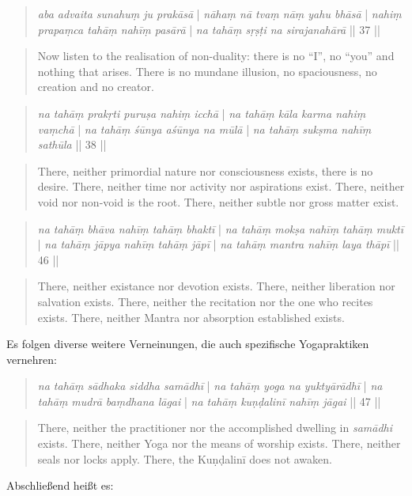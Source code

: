 \begin{quote}
\textit{aba advaita sunahuṃ ju prakāsā} | \textit{nāhaṃ nā tvaṃ nāṃ yahu bhāsā} |
\textit{nahiṃ prapaṃca tahāṃ nahīṃ pasārā} | \textit{na tahāṃ sṛṣṭi na sirajanahārā} || 37 ||
\end{quote}
\begin{quote}
Now listen to the realisation of non-duality: there is no ``I'', no ``you'' and nothing that arises. There is no mundane illusion, no spaciousness, no creation and no creator.
\end{quote}
\begin{quote}
\textit{na tahāṃ prakṛti puruṣa nahiṃ icchā} | \textit{na tahāṃ kāla karma nahiṃ vaṃchā} |
\textit{na tahāṃ śūnya aśūnya na mūlā} | \textit{na tahāṃ sukṣma nahīṃ sathūla} || 38 ||
\end{quote}
\begin{quote}
There, neither primordial nature nor consciousness exists, there is no desire. There, neither time nor activity nor aspirations exist. There, neither void nor non-void is the root. There, neither subtle nor gross matter exist.
\end{quote}
\begin{quote}
\textit{na tahāṃ bhāva nahīṃ tahāṃ bhaktī} | \textit{na tahāṃ mokṣa nahīṃ tahāṃ muktī} |
\textit{na tahāṃ jāpya nahīṃ tahāṃ jāpī} | \textit{na tahāṃ mantra nahīṃ laya thāpī} || 46 || 
\end{quote}
\begin{quote}
There, neither existance nor devotion exists. There, neither liberation nor salvation exists. There, neither the recitation nor the one who recites exists. There, neither Mantra nor absorption established exists.
\end{quote}

Es folgen diverse weitere Verneinungen, die auch spezifische Yogapraktiken vernehren:
\begin{quote}
\textit{na tahāṃ sādhaka siddha samādhī} | \textit{na tahāṃ yoga na yuktyārādhī} | 
\textit{na tahāṃ mudrā baṃdhana lāgai} | \textit{na tahāṃ kuṇḍalinī nahīṃ jāgai} || 47 ||
\end{quote}
\begin{quote}
There, neither the practitioner nor the accomplished dwelling in \textit{samādhi} exists. There, neither Yoga nor the means of worship exists. There, neither seals nor locks apply. There, the Kuṇḍalinī does not awaken. 
\end{quote}

Abschließend heißt es:

